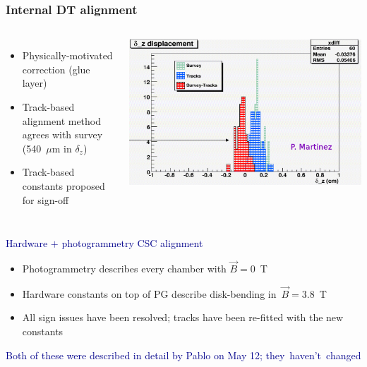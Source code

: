 \documentclass[compress]{beamer}
\begin{document}
\begin{frame}
\frametitle{Internal DT alignment}

\begin{columns}
\begin{itemize}
\item Physically-motivated correction (glue layer)
\item Track-based alignment method agrees with survey (540~$\mu$m in $\delta_z$)
\item Track-based constants proposed for sign-off
\end{itemize}

\includegraphics[width=\linewidth]{internal_alignment.png}
\end{columns}

\vfill
\hspace{-0.83 cm} \textcolor{darkblue}{\Large Hardware $+$ photogrammetry CSC alignment}

\begin{itemize}
\item Photogrammetry describes every chamber with $\vec{B}=0$~T
\item Hardware constants on top of PG describe disk-bending \mbox{in $\vec{B}=3.8$~T\hspace{-1 cm}}
\item All sign issues have been resolved; tracks have been re-fitted with the new constants
\end{itemize}

\hspace{-0.83 cm} \textcolor{darkblue}{Both of these were described in detail by Pablo on May 12; \mbox{they haven't changed\hspace{-1 cm}}}
\end{frame}
\end{document}

